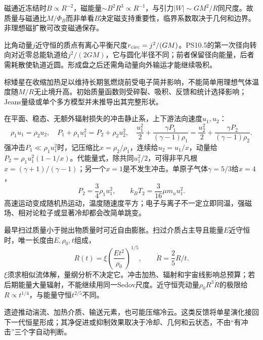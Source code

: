 磁通近冻结时$B\propto R^{-2}$，磁能量$\sim B^2R^3\propto R^{-1}$，与引力$|W|\sim GM^2/R$同尺度。故质量与磁通比$M/\Phi_B$而非单看$B$决定磁支持重要性，临界系数取决于几何和边界。非理想磁扩散可改变磁通保存。

比角动量$j$近守恒的质点有离心平衡尺度$r_{\rm circ}=j^2/(GM)$。PS10.5的第一次径向转向对近零总能轨道给$j^2/(2GM)$，它与圆化半径不同；前者保留径向能量，后者需耗散使轨道近圆。形成盘之后还需角动量向外输运才能继续吸积。

棕矮星在收缩加热足以维持长期氢燃烧前受电子简并影响，不能简单用理想气体温度随$M/R$无止境升高。初始质量函数则受碎裂、吸积、反馈和统计选择影响；Jeans量级或单个多方模型并未推导出其完整形状。

在平面、稳态、无额外辐射损失的冲击静止系，上下游法向速度$u_1,u_2$：
\[
 \rho_1u_1=\rho_2u_2,\quad
 P_1+\rho_1u_1^2=P_2+\rho_2u_2^2,\quad
 \frac{u_1^2}{2}+\frac{\gamma P_1}{(\gamma-1)\rho_1}
 =\frac{u_2^2}{2}+\frac{\gamma P_2}{(\gamma-1)\rho_2}.
\]
强冲击$P_1\ll\rho_1u_1^2$时，记压缩比$x=\rho_2/\rho_1$，连续给$u_2=u_1/x$，动量给$P_2=\rho_1u_1^2(1-1/x)$。代能量式，除共同$u_1^2/2$，可得非平凡根$x=(\gamma+1)/(\gamma-1)$；另一个$x=1$是不发生冲击。单原子气体$\gamma=5/3$给$x=4$，
\[
 P_2=\frac34\rho_1u_1^2,\qquad
 k_BT_2=\frac{3}{16}\mu m_u u_1^2.
\]
高速运动变成随机热运动，温度随速度平方；电子与离子不一定立即同温，强磁场、相对论粒子或显著冷却都会改简单跳变。

最早扫过质量小于抛出物质量时可近自由膨胀。扫过介质占主导且能量$E$近守恒时，唯一长度由$E,\rho_0,t$组成，
\[
 R(t)=\xi\left(\frac{Et^2}{\rho_0}\right)^{1/5},\qquad
 \dot R=\frac25R/t.
\]
$\xi$须求相似流体解，量纲分析不决定它。冲击加热、辐射和宇宙线影响总预算；若后期能量大量辐射，不能继续用同一Sedov尺度。近守恒壳动量$\rho_0R^3\dot R$的极限给$R\propto t^{1/4}$，与能量守恒$t^{2/5}$不同。

遗迹推动湍流、加热介质、输送元素，也可能压缩冷云。这类反馈将单星演化接回下一代恒星形成；其净促进或抑制效果取决于冷却、几何和云状态，不由“有冲击”三个字自动判断。
